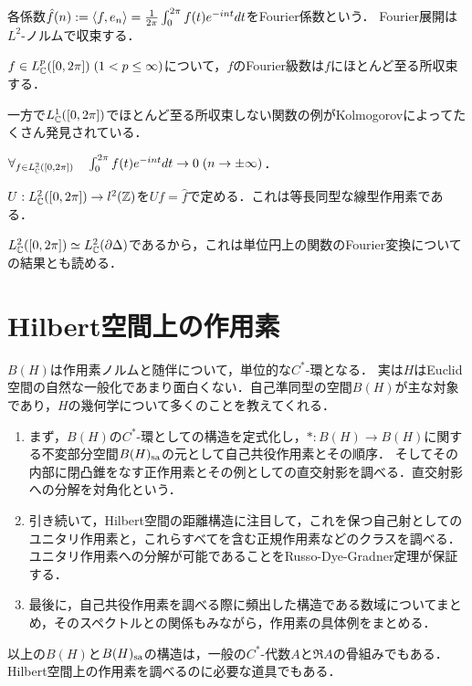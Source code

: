 \documentclass[uplatex,dvipdfmx]{jsreport}
\begin{document}
各係数$\hat{f}(n):=\langle f,e_n\rangle=\frac{1}{2\pi}\int^{2\pi}_0f(t)e^{-int}dt$をFourier係数という．
Fourier展開は$L^2$-ノルムで収束する．
\begin{theorem}
    $f\in L^p_{\mathbb{C}}([0,2\pi])\;(1<p\le\infty)$について，$f$のFourier級数は$f$にほとんど至る所収束する．
\end{theorem}
\begin{remarks}
    一方で$L^1_{\mathbb{C}}([0,2\pi])$でほとんど至る所収束しない関数の例がKolmogorovによってたくさん発見されている．
\end{remarks}

\begin{lemma}
    $\forall_{f\in L^2_{\mathbb{C}}([0,2\pi])}\quad\int^{2\pi}_0f(t)e^{-int}dt\to 0\;(n\to\pm\infty)$．
\end{lemma}

\begin{theorem}
    $U:L^2_{\mathbb{C}}([0,2\pi])\to l^2(\mathbb{Z})$を$Uf=\hat{f}$で定める．これは等長同型な線型作用素である．
\end{theorem}
\begin{remarks}
    $L^2_{\mathbb{C}}([0,2\pi])\simeq L^2_{\mathbb{C}}(\partial\Delta)$であるから，これは単位円上の関数のFourier変換についての結果とも読める．
\end{remarks}

\section{Hilbert空間上の作用素}

\begin{tcolorbox}[colframe=ForestGreen, colback=ForestGreen!10!white,breakable,colbacktitle=ForestGreen!40!white,coltitle=black,fonttitle=\bfseries\sffamily,
title=]
    $B(H)$は作用素ノルムと随伴について，単位的な$C^*$-環となる．
    実は$H$はEuclid空間の自然な一般化であまり面白くない．自己準同型の空間$B(H)$が主な対象であり，$H$の幾何学について多くのことを教えてくれる．
    \begin{enumerate}
        \item まず，$B(H)$の$C^*$-環としての構造を定式化し，$*:B(H)\to B(H)$に関する不変部分空間$B(H)_{\mathrm{sa}}$の元として自己共役作用素とその順序．
        そしてその内部に閉凸錐をなす正作用素とその例としての直交射影を調べる．直交射影への分解を対角化という．
        \item 引き続いて，Hilbert空間の距離構造に注目して，これを保つ自己射としてのユニタリ作用素と，これらすべてを含む正規作用素などのクラスを調べる．ユニタリ作用素への分解が可能であることをRusso-Dye-Gradner定理が保証する．
        \item 最後に，自己共役作用素を調べる際に頻出した構造である数域についてまとめ，そのスペクトルとの関係もみながら，作用素の具体例をまとめる．
    \end{enumerate}
    以上の$B(H)$と$B(H)_{\mathrm{sa}}$の構造は，一般の$C^*$-代数$A$と$\Re A$の骨組みでもある．
    Hilbert空間上の作用素を調べるのに必要な道具でもある．
\end{tcolorbox}
\end{document}
